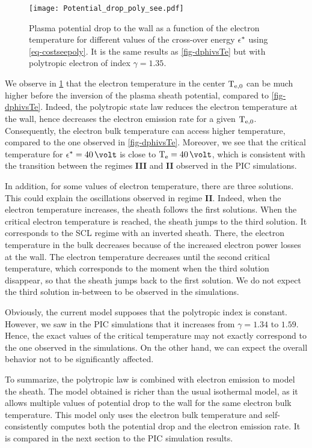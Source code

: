 \begin{figure}[hbtp]
  \centering
  \texttt{[image: Potential\_drop\_poly\_see.pdf]}
  \caption{ Plasma potential drop to the wall as a function of the electron temperature for different values of the cross-over energy $\epsilon^{*}$ using \cref{eq-costseepoly}. It is the same results as  \cref{fig-dphivsTe} but with polytropic electron of index $\gamma=1.35$.}
  \label{fig-rso_crit_see}
\end{figure}

We observe in \cref{fig-rso_crit_see} that the electron temperature in the center $\mathrm{T_{e, 0}}$ can be much higher before the inversion of the plasma sheath potential, compared to \cref{fig-dphivsTe}.
Indeed, the polytropic state law reduces the electron temperature at the wall, hence decreases the electron emission rate for a given $\mathrm{T_{e, 0}}$.
Consequently, the electron bulk temperature can access higher temperature, compared to the one observed in \cref{fig-dphivsTe}.
Moreover, we see that the critical temperature for $\crover=40 \,\volt$ is close to $\Te=40\,\volt$, which is consistent with the transition between the regimes {\bf III} and {\bf II} observed in the \ac{PIC} simulations.

In addition, for some values of electron temperature, there are three solutions.
This could explain the oscillations observed in regime {\bf II}.
Indeed, when the electron temperature increases, the sheath follows the first solutions.
When the critical electron temperature is reached, the sheath jumps to the third solution.
It corresponds to the \ac{SCL} regime with an inverted sheath.
There, the electron temperature in the bulk decreases because of the increased electron power losses at the wall.
The electron temperature decreases until the second critical temperature, which corresponds to the moment when the third solution disappear, so that the sheath jumps back to the first solution.
We do not expect the third solution in-between to be observed in the simulations.

Obviously, the current model supposes that the polytropic index is constant.
However, we saw in the \ac{PIC} simulations that it increases from $\gamma = 1.34$ to $1.59$.
Hence, the exact values of the critical temperature may not exactly correspond to the one observed in the simulations.
On the other hand, we can expect the overall behavior not to be significantly affected.

\vspace{1em}
To summarize, the polytropic law is combined with electron emission to model the sheath.
The model obtained is richer than the usual isothermal model, as it allows multiple values of potential drop to the wall for the same electron bulk temperature.
This model only uses the electron bulk temperature and self-consistently computes both the potential drop and the electron emission rate.
It is compared in the next section to the \ac{PIC} simulation results.
